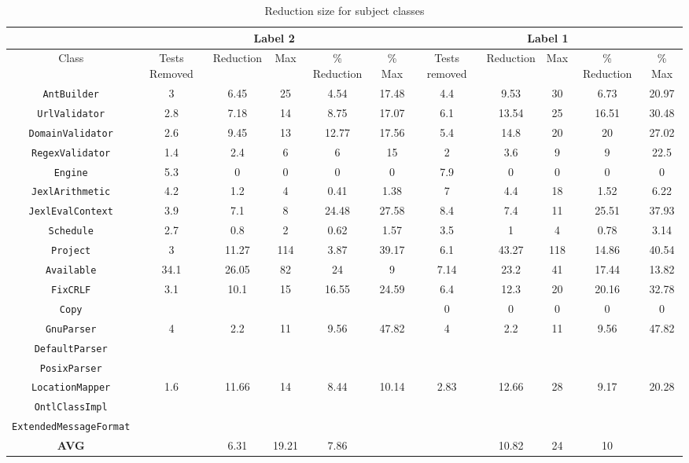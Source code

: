 \begin{table*}
\begin{center}
\begin{tabular}{|c||c|c|c|c|c||c|c|c|c|c|}
\hline
\hline
& \multicolumn{5}{|c|}{Label 2} & \multicolumn{5}{|c|}{Label 1} \\
\hline
Class & Tests Removed & Reduction & Max & \% Reduction & \% Max & Tests removed & Reduction & Max & \% Reduction & \% Max \\
\hline
\hline
{\tt AntBuilder} & 3 & 6.45 & 25 & 4.54 & 17.48 & 4.4 & 9.53 & 30 & 6.73 & 20.97 \\
\hline
{\tt UrlValidator} & 2.8 & 7.18 & 14 & 8.75 & 17.07 & 6.1 & 13.54 & 25 & 16.51 & 30.48 \\
\hline
{\tt DomainValidator} & 2.6 & 9.45 & 13 & 12.77 & 17.56 & 5.4 & 14.8 & 20 & 20 & 27.02 \\
\hline
{\tt RegexValidator} & 1.4 & 2.4 & 6 & 6 & 15 & 2 & 3.6 & 9 & 9 & 22.5 \\
\hline
{\tt Engine} & 5.3 & 0 & 0 & 0 & 0 & 7.9 & 0 & 0 & 0 & 0 \\
\hline
{\tt JexlArithmetic} & 4.2 & 1.2 & 4 & 0.41 & 1.38 & 7 & 4.4 & 18 & 1.52 & 6.22 \\ 
\hline
{\tt JexlEvalContext} & 3.9 & 7.1 & 8 & 24.48 & 27.58 & 8.4 & 7.4 & 11 & 25.51 & 37.93\\
\hline
{\tt Schedule} & 2.7 & 0.8 & 2 & 0.62 & 1.57 & 3.5 & 1 & 4 & 0.78 & 3.14\\
\hline
{\tt Project} & 3 & 11.27 & 114 & 3.87 & 39.17 & 6.1 & 43.27 & 118 & 14.86 & 40.54\\
\hline
{\tt Available} & 34.1 & 26.05 & 82 & 24 & 9 & 7.14 & 23.2 & 41 & 17.44 & 13.82\\
\hline
{\tt FixCRLF} & 3.1 & 10.1 & 15 & 16.55 & 24.59 & 6.4 & 12.3 & 20 & 20.16 & 32.78\\
\hline
{\tt Copy} &  &  &  &  &  & 0 & 0 & 0 & 0 & 0\\
\hline
{\tt GnuParser} & 4 & 2.2 & 11 & 9.56 & 47.82 & 4 & 2.2 & 11 & 9.56 & 47.82\\
\hline
{\tt DefaultParser} &  &  &  &  &  &  &  &  &  & \\
\hline
{\tt PosixParser} &  &  &  &  &  &  &  &  &  & \\
\hline

{\tt LocationMapper} & 1.6 & 11.66 & 14 & 8.44 & 10.14 & 2.83 & 12.66 & 28 & 9.17 & 20.28\\
\hline
{\tt OntlClassImpl} &  &  &  &  &  &  &  &  &  & \\
\hline
{\tt ExtendedMessageFormat} &  &  &  &  &  &  &  &  &  & \\
\hline
\hline
{\bf AVG} & & 6.31 & 19.21 & 7.86 &  &  & 10.82 & 24 & 10 &  \\
\hline
\hline
\end{tabular}
\end{center}
\caption{Reduction size for subject classes}
\label{tab:avgimproved}
\end{table*}
